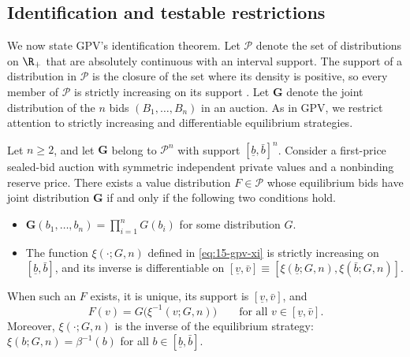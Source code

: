 \subsection{Identification and testable restrictions}\label{sec:15-gpv-ident}

We now state GPV's identification theorem. Let $\mathcal P$ denote the set of distributions on $\R_+$ that are absolutely continuous with an interval support. The support of a distribution in $\mathcal P$ is the closure of the set where its density is positive, so every member of $\mathcal P$ is strictly increasing on its support \citep[footnote 4]{GuerrePerrigneVuong2000}. Let $\mathbf G$ denote the joint distribution of the $n$ bids $(B_1,\dots,B_n)$ in an auction. As in GPV, we restrict attention to strictly increasing and differentiable equilibrium strategies.

\begin{theorem}\label{thm:15-gpv-ident}
Let $n\ge 2$, and let $\mathbf G$ belong to $\mathcal P^n$ with support $[\underline b,\bar b]^n$. Consider a first-price sealed-bid auction with symmetric independent private values and a nonbinding reserve price. There exists a value distribution $F\in\mathcal P$ whose equilibrium bids have joint distribution $\mathbf G$ if and only if the following two conditions hold.
\begin{itemize}
\item[(C1)] $\mathbf G(b_1,\dots,b_n)=\prod_{i=1}^n G(b_i)$ for some distribution $G$.
\item[(C2)] The function $\xi(\cdot;G,n)$ defined in \eqref{eq:15-gpv-xi} is strictly increasing on $[\underline b,\bar b]$, and its inverse is differentiable on $[\underline v,\bar v]\equiv[\xi(\underline b;G,n),\xi(\bar b;G,n)]$.
\end{itemize}
When such an $F$ exists, it is unique, its support is $[\underline v,\bar v]$, and
\begin{equation}\label{eq:15-gpv-F}
F(v)=G\big(\xi^{-1}(v;G,n)\big)\qquad\text{for all }v\in[\underline v,\bar v].
\end{equation}
Moreover, $\xi(\cdot;G,n)$ is the inverse of the equilibrium strategy: $\xi(b;G,n)=\beta^{-1}(b)$ for all $b\in[\underline b,\bar b]$.
\end{theorem}

